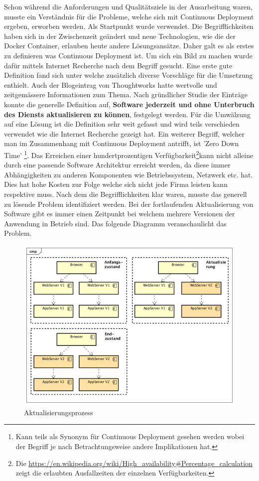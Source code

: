 Schon während die Anforderungen und Qualitätsziele in der Ausarbeitung waren, musste ein Verständnis für die Probleme, welche sich mit Continuous Deployment ergeben, erworben werden. Als Startpunkt wurde \cite{cd} verwendet. Die Begrifflichkeiten haben sich in der Zwischenzeit geändert und neue Technologien, wie die der Docker Container, erlauben heute andere Lösungsansätze. Daher galt es als erstes zu definieren was Continuous Deployment ist. Um sich ein Bild zu machen wurde dafür mittels Internet Recherche nach dem Begriff gesucht. Eine erste gute Definition fand sich unter \cite{atlassiancd} welche zusätzlich diverse Vorschläge für die Umsetzung enthielt. Auch der Blogeintrag von Thoughtworks \cite{thoughtcd} hatte wertvolle und zeitgemässere Informationen zum Thema. Nach gründlicher Studie der Einträge konnte die generelle Definition auf, \textbf{Software jederzeit und ohne Unterbruch des Diensts aktualisieren zu können}, festgelegt werden. Für die Umwälzung auf eine Lösung ist die Definition sehr weit gefasst und wird teils verschieden verwendet wie die Internet Recherche gezeigt hat. Ein weiterer Begriff, welcher man im Zusammenhang mit Continuous Deployment antrifft, ist 'Zero Down Time' \footnote{Kann teils als Synonym für Continuous Deployment gesehen werden wobei der Begriff je nach Betrachtungsweise andere Implikationen hat.}. Das Erreichen einer hundertprozentigen Verfügbarkeit\footnote{Die \url{https://en.wikipedia.org/wiki/High_availability\#Percentage_calculation} zeigt die erlaubten Ausfallzeiten der einzelnen Verfügbarkeiten.}kann nicht alleine durch eine passende Software Architektur erreicht werden, da diese immer Abhängigkeiten zu anderen Komponenten wie Betriebssystem, Netzwerk etc. hat. Dies hat hohe Kosten zur Folge welche sich nicht jede Firma leisten kann respektive muss.\newline
Nach dem die Begrifflichkeiten klar waren, musste das generell zu lösende Problem identifiziert werden. Bei der fortlaufenden Aktualisierung von Software gibt es immer einen Zeitpunkt bei welchem mehrere Versionen der Anwendung in Betrieb sind. Das folgende Diagramm veranschaulicht das Problem.
\begin{figure}[H]
	\centering
	\includegraphics[scale=0.55]{MultiVersion.png}
	\caption{Aktualisierungsprozess}
\end{figure}
